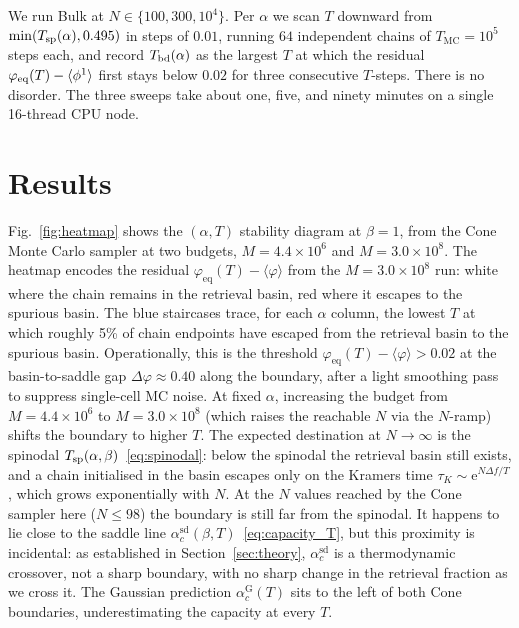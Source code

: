 \documentclass[letterpaper]{article} %
\newcommand{\avg}[1]{\langle #1 \rangle}
\newcommand{\e}{{\mathrm{e}}}
\newcommand{\Bnet}{\beta}
\newcommand{\acGauss}{\alpha_c^{\mathrm{G}}}
\newcommand{\acSd}{\alpha_c^{\mathrm{sd}}}
\begin{document}
We run Bulk at $N \in \{100, 300, 10^4\}$.  Per $\alpha$ we scan $T$
downward from $\min(T_{\rm sp}(\alpha), 0.495)$ in steps of $0.01$,
running $64$ independent chains of $T_{\mathrm{MC}} = 10^5$ steps each,
and record $T_{\rm bd}(\alpha)$ as the largest $T$ at which the
residual $\varphi_{\rm eq}(T) - \avg{\phi^1}$ first stays below $0.02$
for three consecutive $T$-steps.  There is no disorder.  The three
sweeps take about one, five, and ninety minutes on a single
16-thread CPU node.



\section{Results}
\label{sec:results}

Fig.~\ref{fig:heatmap} shows the $(\alpha, T)$ stability diagram at
$\Bnet = 1$, from the Cone Monte Carlo sampler at two budgets,
$M = 4.4 \times 10^6$ and $M = 3.0 \times 10^8$. The heatmap encodes the
residual $\varphi_{\mathrm{eq}}(T) - \langle\varphi\rangle$ from the
$M = 3.0 \times 10^8$ run: white where the chain remains in the retrieval
basin, red where it escapes to the spurious basin. The blue staircases trace,
for each $\alpha$ column, the lowest $T$ at which roughly 5\% of chain
endpoints have escaped from the retrieval basin to the spurious basin.
Operationally, this is the threshold
$\varphi_{\mathrm{eq}}(T) - \langle\varphi\rangle > 0.02$ at the
basin-to-saddle gap $\Delta\varphi \approx 0.40$ along the boundary, after
a light smoothing pass to suppress single-cell MC noise. At fixed $\alpha$, increasing the budget from $M = 4.4 \times 10^6$ to
$M = 3.0 \times 10^8$ (which raises the reachable $N$ via the $N$-ramp)
shifts the boundary to higher $T$. The expected destination at
$N \to \infty$ is the spinodal $T_{\rm sp}(\alpha, \Bnet)$~\eqref{eq:spinodal}:
below the spinodal the retrieval basin still exists, and a chain initialised
in the basin escapes only on the Kramers time
$\tau_K \sim \e^{N \Delta f / T}$, which grows exponentially with $N$.  At
the $N$ values reached by the Cone sampler here ($N \le 98$) the boundary
is still far from the spinodal.  It happens to lie close to the saddle
line $\acSd(\Bnet, T)$~\eqref{eq:capacity_T}, but this proximity is
incidental: as established in Section~\ref{sec:theory}, $\acSd$ is a
thermodynamic crossover, not a sharp boundary, with no sharp change
in the retrieval fraction as we cross it.  The Gaussian prediction
$\acGauss(T)$ sits to the left of both Cone boundaries, underestimating
the capacity at every $T$.
\end{document}
